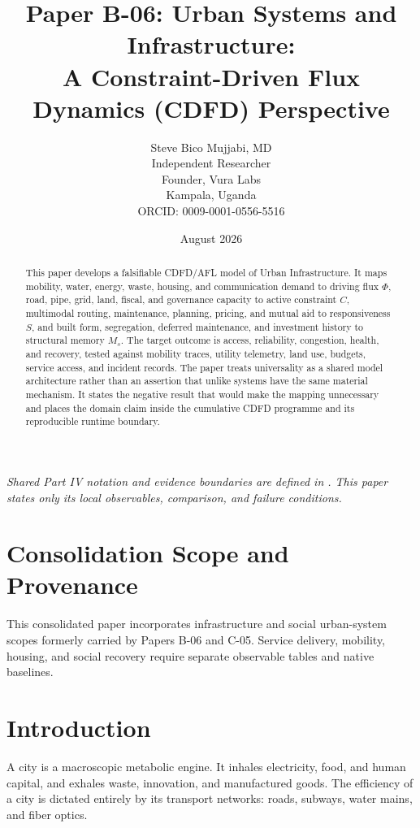 \documentclass[11pt,a4paper]{article}
\title{\textbf{Paper B-06: Urban Systems and Infrastructure:\\ A Constraint-Driven Flux Dynamics (CDFD) Perspective}}
\author{Steve Bico Mujjabi, MD\\
\small Independent Researcher\\
\small Founder, Vura Labs\\
\small Kampala, Uganda\\
\small ORCID: 0009-0001-0556-5516}
\date{August 2026}
\begin{document}
\maketitle

\noindent\textit{Shared Part IV notation and evidence boundaries are defined in . This paper states only its local observables, comparison, and failure conditions.}


\begin{abstract}
This paper develops a falsifiable CDFD/AFL model of Urban Infrastructure. It maps mobility, water, energy, waste, housing, and communication demand to driving flux $\Phi$, road, pipe, grid, land, fiscal, and governance capacity to active constraint $C$, multimodal routing, maintenance, planning, pricing, and mutual aid to responsiveness $S$, and built form, segregation, deferred maintenance, and investment history to structural memory $M_s$. The target outcome is access, reliability, congestion, health, and recovery, tested against mobility traces, utility telemetry, land use, budgets, service access, and incident records. The paper treats universality as a shared model architecture rather than an assertion that unlike systems have the same material mechanism. It states the negative result that would make the mapping unnecessary and places the domain claim inside the cumulative CDFD programme and its reproducible runtime boundary.
\end{abstract}
\section*{Consolidation Scope and Provenance}
This consolidated paper incorporates infrastructure and social urban-system scopes formerly carried by Papers B-06 and C-05. Service delivery, mobility, housing, and social recovery require separate observable tables and native baselines.


\section{Introduction}

A city is a macroscopic metabolic engine. It inhales electricity, food, and human capital, and exhales waste, innovation, and manufactured goods. The efficiency of a city is dictated entirely by its transport networks: roads, subways, water mains, and fiber optics.
\end{document}
